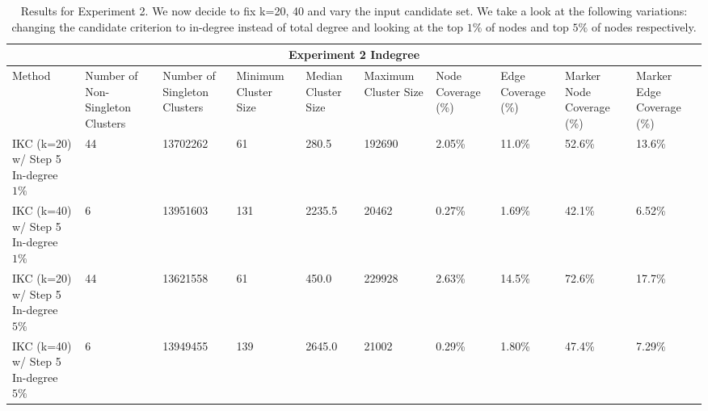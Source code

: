 \documentclass{article}
\begin{document}
\begin{table}[h!]
	\centering
	\begin{small}
		\begin{tabular}{ |p{0.95cm}||p{1.25cm}|p{1.25cm}||p{1.20cm}|p{1.20cm}|p{1.20cm}||p{1.25cm}|p{1.25cm}|| p{1.25cm}|p{1.25cm}| }
			\hline
			\multicolumn{10}{|c|}{Experiment 2 Indegree} \\
			\hline
			Method & Number of Non-Singleton Clusters & Number of Singleton Clusters & Minimum Cluster Size &  Median Cluster Size & Maximum Cluster Size & Node Coverage (\%)& Edge Coverage  (\%)& Marker Node Coverage  (\%)& Marker Edge Coverage  (\%)\\
			\hline
			IKC (k=20)  w/ Step 5 In-degree $1\%$ &  44    & \cellcolor{blue!20} 13702262 &   61 & \cellcolor{red!20} 280.5 & \cellcolor{blue!20}192690 & 2.05\% & \cellcolor{blue!20}11.0\% & \cellcolor{blue!20}52.6\% & \cellcolor{blue!20}13.6\% \\ \hline

			IKC (k=40)  w/ Step 5 In-degree $1\%$ &  6    & \cellcolor{red!20}13951603 &   \cellcolor{red!20}131 & \cellcolor{red!20}2235.5 & \cellcolor{blue!20}20462 & 0.27\% & \cellcolor{blue!20}1.69\% & \cellcolor{blue!20}42.1\% & \cellcolor{blue!20}6.52\% \\ \hline
			
			IKC (k=20)  w/ Step 5 In-degree $5\%$&  44    & \cellcolor{blue!20}13621558 &   61 & \cellcolor{red!20}450.0 & \cellcolor{red!20}229928 & \cellcolor{red!20}2.63\% & \cellcolor{red!20}14.5\% & \cellcolor{red!20}72.6\% & \cellcolor{red!20}17.7\% \\ \hline
			
			IKC (k=40)  w/ Step 5 In-degree $5\%$ &  6    & \cellcolor{blue!20}13949455 &   \cellcolor{red!20}139 & \cellcolor{red!20}2645.0 & \cellcolor{red!20}21002 & \cellcolor{red!20}0.29\% & \cellcolor{red!20}1.80\% & \cellcolor{red!20}47.4\% & \cellcolor{red!20}7.29\% \\ \hline

			 \hline
			\hline
					\end{tabular}
		\end{small}
	\caption{Results for Experiment 2. We now decide to fix k=20, 40 and vary the input candidate set. We take a look at the following variations:  changing the candidate criterion to in-degree instead of total degree and looking at the top $1\%$ of nodes and top $5\%$ of nodes respectively. }
	\label{table:expt2indegree}
\end{table}
\end{document}
